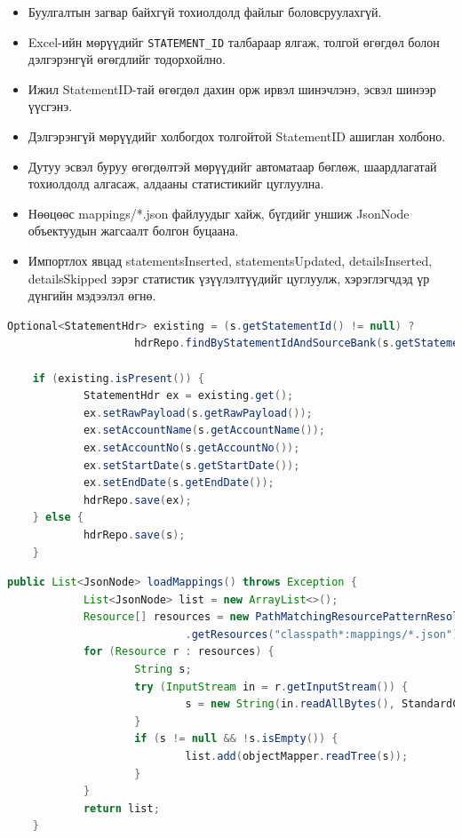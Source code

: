 \begin{itemize}
	\item Буулгалтын загвар байхгүй тохиолдолд файлыг боловсруулахгүй.
	\item Excel-ийн мөрүүдийг \verb|STATEMENT_ID| талбараар ялгаж, толгой өгөгдөл болон дэлгэрэнгүй өгөгдлийг тодорхойлно.
	\item Ижил StatementID-тай өгөгдөл дахин орж ирвэл шинэчлэнэ, эсвэл шинээр үүсгэнэ.
	\item Дэлгэрэнгүй мөрүүдийг холбогдох толгойтой StatementID ашиглан холбоно.
	\item Дутуу эсвэл буруу өгөгдөлтэй мөрүүдийг автоматаар бөглөж, шаардлагатай тохиолдолд алгасаж, алдааны статистикийг цуглуулна.
	\item Нөөцөөс mappings/*.json файлуудыг хайж, бүгдийг уншиж JsonNode объектуудын жагсаалт болгон буцаана.
	\item Импортлох явцад statementsInserted, statementsUpdated, detailsInserted, detailsSkipped зэрэг статистик үзүүлэлтүүдийг цуглуулж, хэрэглэгчдэд үр дүнгийн мэдээлэл өгнө.
\end{itemize}

\begin{lstlisting}[language=Java, caption=Давхардсан өгөгдлийг шийдвэрлэх, frame=single]
	Optional<StatementHdr> existing = (s.getStatementId() != null) ?
					hdrRepo.findByStatementIdAndSourceBank(s.getStatementId(), sourceBank) : Optional.empty();

	if (existing.isPresent()) {
			StatementHdr ex = existing.get();
			ex.setRawPayload(s.getRawPayload());
			ex.setAccountName(s.getAccountName());
			ex.setAccountNo(s.getAccountNo());
			ex.setStartDate(s.getStartDate());
			ex.setEndDate(s.getEndDate());
			hdrRepo.save(ex);
	} else {
			hdrRepo.save(s);
	}
\end{lstlisting}

\begin{lstlisting}[language=Java, caption=Нөөцийн хэсгээс буулгалтын загваруудын мэдээллийг унших, frame=single]
	public List<JsonNode> loadMappings() throws Exception {
			List<JsonNode> list = new ArrayList<>();
			Resource[] resources = new PathMatchingResourcePatternResolver()
							.getResources("classpath*:mappings/*.json");
			for (Resource r : resources) {
					String s;
					try (InputStream in = r.getInputStream()) {
							s = new String(in.readAllBytes(), StandardCharsets.UTF_8);
					}
					if (s != null && !s.isEmpty()) {
							list.add(objectMapper.readTree(s));
					}
			}
			return list;
	}
\end{lstlisting}

